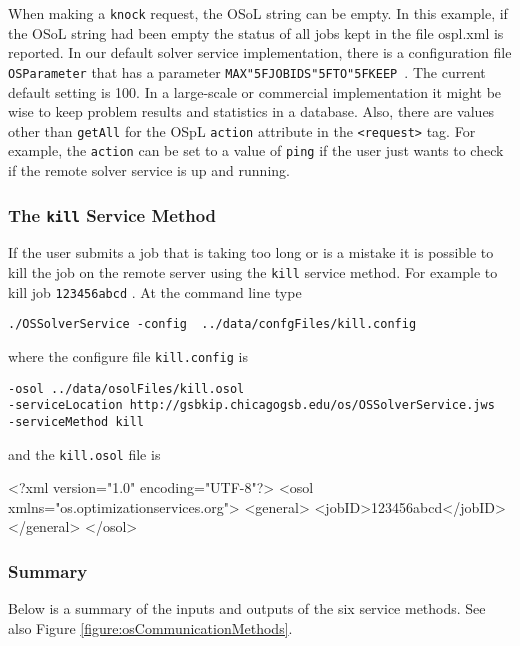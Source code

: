 \documentclass[11pt]{article}
\newcounter{Fig}
\renewcommand{\_}{{\char"5F}}
\renewcommand{\{}{{\char"7B}}
\renewcommand{\}}{{\char"7D}}
\renewcommand{\^}{{\char"0D}}
\renewcommand{\'}{{\char"0D}}
\begin{document}
When making a {\tt knock} request,  the OSoL string can be empty. In this example, if the OSoL string had been empty the status of all jobs kept in the file ospl.xml is reported.  In our default solver service implementation, there is a configuration file {\tt OSParameter} that has a parameter {\tt MAX\_JOBIDS\_TO\_KEEP }.  The current default setting is 100.  In a large-scale or commercial implementation it might be wise to keep problem results and statistics in a database.  Also, there are values other than {\tt getAll} for the OSpL {\tt action} attribute in the {\tt <request>} tag.  For example, the {\tt action} can be set to a value of {\tt ping} if the user just wants to check if the remote solver service is up and running. 



\subsubsection{The  {\tt kill}   Service Method}

If the user submits a job that is taking too long or is a mistake it is possible to kill the job on the remote server using the {\tt kill} service method. For example to kill job {\tt 123456abcd} .  At the command line type
\begin{verbatim}
./OSSolverService -config  ../data/confgFiles/kill.config
\end{verbatim}
where the configure file {\tt kill.config} is
\begin{verbatim}
-osol ../data/osolFiles/kill.osol
-serviceLocation http://gsbkip.chicagogsb.edu/os/OSSolverService.jws
-serviceMethod kill
\end{verbatim}
and the {\tt kill.osol} file is
\begin{verbatimtab}[4]
<?xml version="1.0" encoding="UTF-8"?>
<osol xmlns="os.optimizationservices.org">
 	<general>         
 		<jobID>123456abcd</jobID>  
	</general>
</osol>
\end{verbatimtab}


\subsubsection{Summary}

Below is a summary of the inputs and outputs of the six service methods. See also Figure \ref{figure:osCommunicationMethods}.
\end{document}

